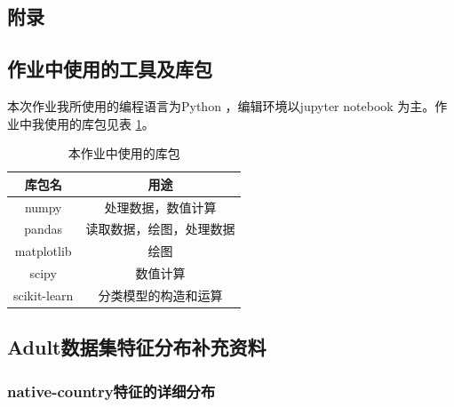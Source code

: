 \documentclass[12pt,a4paper]{article}
\theoremstyle{definition}
\begin{document}
\newpage
\begin{appendix}
	\section{附录}
	\subsection{作业中使用的工具及库包}
	\label{apd:tools}
	本次作业我所使用的编程语言为Python \cite{python}，编辑环境以jupyter notebook \cite{notebook} 为主。作业中我使用的库包见表 \ref{tab:import}。
	
	\begin{table}[H]
		\renewcommand\arraystretch{1.35}
		\caption{本作业中使用的库包}
		\label{tab:import}
		\centering
		
		\begin{tabular}{c|c}
			\centering
			库包名 &  用途 \\
			\hline
	
			numpy \cite{numpy} & 处理数据，数值计算 \\
			pandas \cite{pandas} & 读取数据，绘图，处理数据 \\
			matplotlib \cite{matplotlib} & 绘图 \\
			scipy \cite{scipy} & 数值计算 \\
			scikit-learn \cite{sklearn} & 分类模型的构造和运算 \\
	
		\end{tabular}
	\end{table}
	
	\subsection{Adult数据集特征分布补充资料}
	
	\subsubsection{native-country特征的详细分布}
	\label{apd:native-country}
	

\end{appendix}
\end{document}
